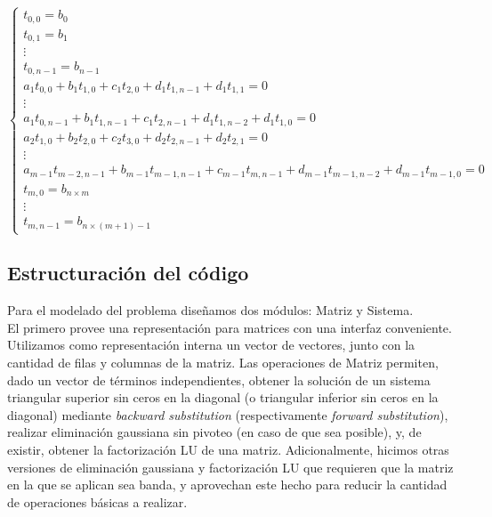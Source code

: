 \begin{equation}
\label{sisecu}
  \left\lbrace
  \begin{array}{l}
     t_{0,0} = b_0 \\
     t_{0,1} = b_1 \\
     \vdots\\
     t_{0,n-1} = b_{n-1} \\
		 a_1 t_{0,0} + b_1 t_{1,0} + c_1 t_{2, 0} + d_1 t_{1, n-1} + d_1 t_{1, 1} = 0\\
		 \vdots\\
		 a_1 t_{0,n-1} + b_1 t_{1,n-1} + c_1 t_{2, n-1} + d_1 t_{1, n-2} + d_1 t_{1, 0} = 0\\
		 a_2 t_{1,0} + b_2 t_{2,0} + c_2 t_{3, 0} + d_2 t_{2, n-1} + d_2 t_{2, 1} = 0\\
		 \vdots\\
		 a_{m-1} t_{m-2,n-1} + b_{m-1} t_{m-1,n-1} + c_{m-1} t_{m, n-1} + d_{m-1} t_{m-1, n-2} + d_{m-1} t_{m-1, 0} = 0\\
		 t_{m,0} = b_{n\times m}\\
		 \vdots\\
		 t_{m, n-1} = b_{n\times (m+1)-1}
		 
  \end{array}
  \right.
\end{equation}




\subsection{Estructuración del código}
Para el modelado del problema diseñamos dos módulos: Matriz y Sistema. \\
El primero provee una representación para matrices con una interfaz conveniente. Utilizamos como representación interna un vector de vectores, junto con la cantidad de filas y columnas de la matriz. Las operaciones de Matriz permiten, dado un vector de términos independientes, obtener la solución de un sistema triangular superior sin ceros en la diagonal (o triangular inferior sin ceros en la diagonal) mediante \textit{backward substitution} (respectivamente \textit{forward substitution}), realizar eliminación gaussiana sin pivoteo (en caso de que sea posible), y, de existir, obtener la factorización LU de una matriz. Adicionalmente, hicimos otras versiones de eliminación gaussiana y factorización LU que requieren que la matriz en la que se aplican sea banda, y aprovechan este hecho para reducir la cantidad de operaciones básicas a realizar.\\
